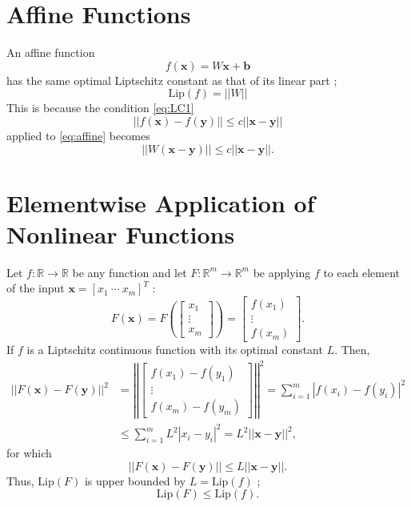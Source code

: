 \documentclass[11pt]{report}
\newcommand\bx{\ensuremath{\boldsymbol x}}
\newcommand\by{\ensuremath{\boldsymbol y}}
\newcommand\bb{\ensuremath{\boldsymbol b}}
\newcommand\lip{\ensuremath{\text{Lip}}}
\begin{document}
\section{Affine Functions}
An affine function 
\begin{equation}\label{eq:affine}
f(\bx)=W\bx+\bb
\end{equation}
has the same optimal Liptschitz constant as that of its linear part ; 
\begin{equation}\label{eq:affine_LC}
\lip(f)=||W||
\end{equation}
This is because the condition \eqref{eq:LC1} 
\[
||f(\bx)-f(\by)||\le c||\bx-\by||
\]
applied to \eqref{eq:affine} becomes
\[
||W(\bx-\by)||\le c||\bx-\by||.
\]

\section{Elementwise Application of Nonlinear Functions}
Let \(f:\mathbb R\to\mathbb R\) be any function and let \(F:\mathbb R^m\to\mathbb R^m\) be applying \(f\) to each element of the input \(\bx = [x_1\:\cdots\:x_m]^T\) :
\begin{equation}\label{eq:elementwise}
F(\bx)=F\left(\begin{bmatrix}x_1\\\vdots\\x_m\end{bmatrix}\right)=
\begin{bmatrix}f(x_1)\\\vdots\\f(x_m)\end{bmatrix}.
\end{equation}
If \(f\) is a Liptschitz continuous function with its optimal constant \(L\).
Then,
\begin{align*}
||F(\bx)-F(\by)||^2
&=\left|\left|\begin{bmatrix}f(x_1)-f(y_1)\\\vdots\\f(x_m)-f(y_m)\end{bmatrix}\right|\right|^2
=\sum_{i=1}^m|f(x_i)-f(y_i)|^2\\
&\le\sum_{i=1}^mL^2|x_i-y_i|^2=L^2||\bx-\by||^2,
\end{align*}
for which
\[||F(\bx)-F(\by)||\le L||\bx-\by||.\]
Thus, \(\lip(F)\) is upper bounded by \(L=\lip(f)\) ;
\begin{equation}\label{eq:elementwise_LC}
\lip(F)\le\lip(f).
\end{equation}
\end{document}
